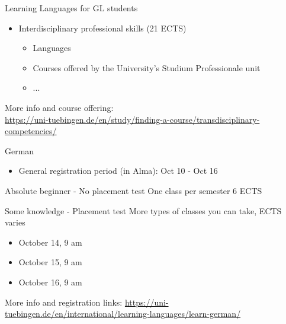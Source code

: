 \documentclass[aspectratio=169,hyperref={unicode}]{beamer}
\begin{document}
\begin{frame}{Learning Languages for GL students}
	\begin{itemize}
		\item Interdisciplinary professional skills (21 ECTS)
			\begin{itemize}
		\item Languages
		\item Courses offered by the University’s Studium Professionale unit
		\item ...
	\end{itemize}
	\end{itemize}
	
\begin{center}
	More info and course offering: \\ \url{https://uni-tuebingen.de/en/study/finding-a-course/transdisciplinary-competencies/}
\end{center}
	
\end{frame}


\begin{frame}{German}

\begin{itemize}
	\item General registration period (in Alma): Oct 10 - Oct 16
\end{itemize}

\begin{block}{Absolute beginner - No placement test}
One class per semester 6 ECTS
\end{block}

\begin{block}{Some knowledge - Placement test}
More types of classes you can take, ECTS varies
\begin{itemize}
	\item October 14, 9 am
	\item October 15, 9 am
	\item October 16, 9 am
\end{itemize}
\end{block}

\begin{center}
	 More info and registration links:
	 \url{https://uni-tuebingen.de/en/international/learning-languages/learn-german/}
\end{center}


\end{frame}
\end{document}
